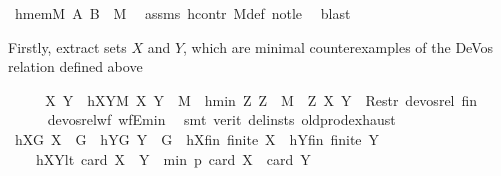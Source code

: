 \begin{isabellebody}
\ hmemM{\isacharcolon}{\kern0pt}\ {\isachardoublequoteopen}{\isacharparenleft}{\kern0pt}A{\isacharcomma}{\kern0pt}\ B{\isacharparenright}{\kern0pt}\ {\isasymin}\ M{\isachardoublequoteclose}\ \isamarkupfalse%
\ assms\ hcontr\ M{\isacharunderscore}{\kern0pt}def\ not{\isacharunderscore}{\kern0pt}le\ \isamarkupfalse%
\ blast%
\begin{isamarkuptext}%
Firstly, extract sets $X$ and $Y$, which are minimal counterexamples of the DeVos relation defined above%
\end{isamarkuptext}\isamarkuptrue%
\ \ \isamarkupfalse%
\ \isamarkupfalse%
\ X\ Y\ \ hXYM{\isacharcolon}{\kern0pt}\ {\isachardoublequoteopen}{\isacharparenleft}{\kern0pt}X{\isacharcomma}{\kern0pt}\ Y{\isacharparenright}{\kern0pt}\ {\isasymin}\ M{\isachardoublequoteclose}\ \ hmin{\isacharcolon}{\kern0pt}\ {\isachardoublequoteopen}{\isasymAnd}Z{\isachardot}{\kern0pt}\ Z\ {\isasymin}\ M\ {\isasymLongrightarrow}\ {\isacharparenleft}{\kern0pt}Z{\isacharcomma}{\kern0pt}\ {\isacharparenleft}{\kern0pt}X{\isacharcomma}{\kern0pt}\ Y{\isacharparenright}{\kern0pt}{\isacharparenright}{\kern0pt}\ {\isasymnotin}\ Restr\ devos{\isacharunderscore}{\kern0pt}rel\ {\isacharquery}{\kern0pt}fin{\isachardoublequoteclose}\ \isanewline
\ \ \ \ \isamarkupfalse%
\ devos{\isacharunderscore}{\kern0pt}rel{\isacharunderscore}{\kern0pt}wf\ wfE{\isacharunderscore}{\kern0pt}min\ \isamarkupfalse%
\ {\isacharparenleft}{\kern0pt}smt\ {\isacharparenleft}{\kern0pt}verit{\isacharcomma}{\kern0pt}\ del{\isacharunderscore}{\kern0pt}insts{\isacharparenright}{\kern0pt}\ old{\isachardot}{\kern0pt}prod{\isachardot}{\kern0pt}exhaust{\isacharparenright}{\kern0pt}\isanewline
\ \ \isamarkupfalse%
\ hXG{\isacharcolon}{\kern0pt}\ {\isachardoublequoteopen}X\ {\isasymsubseteq}\ G{\isachardoublequoteclose}\ \ hYG{\isacharcolon}{\kern0pt}\ {\isachardoublequoteopen}Y\ {\isasymsubseteq}\ G{\isachardoublequoteclose}\ \ hXfin{\isacharcolon}{\kern0pt}\ {\isachardoublequoteopen}finite\ X{\isachardoublequoteclose}\ \ hYfin{\isacharcolon}{\kern0pt}\ {\isachardoublequoteopen}finite\ Y{\isachardoublequoteclose}\ \ \isanewline
\ \ \ \ hXYlt{\isacharcolon}{\kern0pt}\ {\isachardoublequoteopen}card\ {\isacharparenleft}{\kern0pt}X\ {\isasymcdots}\ Y{\isacharparenright}{\kern0pt}\ {\isacharless}{\kern0pt}\ min\ p\ {\isacharparenleft}{\kern0pt}card\ X\ {\isacharplus}{\kern0pt}\ card\ Y\ {\isacharminus}{\kern0pt}\ {}{\isacharparenright}{\kern0pt}{\isachardoublequoteclose}\ \isamarkupfalse%

\end{isabellebody}
